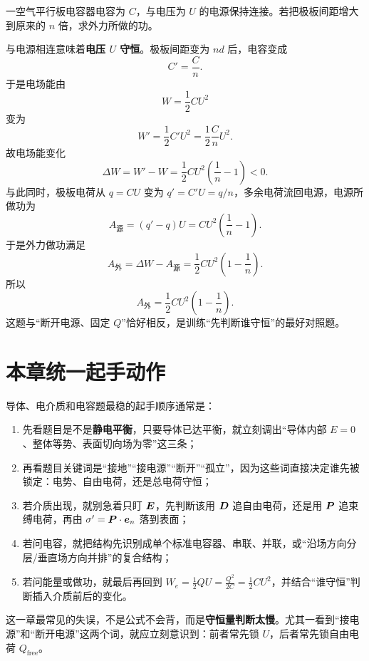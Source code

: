 \documentclass[lang=cn,11pt]{elegantbook}
\begin{document}
\begin{example}[电容器接着电源时拉大板距的外力做功]
一空气平行板电容器电容为 \(C\)，与电压为 \(U\) 的电源保持连接。若把极板间距增大到原来的 \(n\) 倍，求外力所做的功。
\end{example}

\begin{solution}
与电源相连意味着\textbf{电压 \(U\) 守恒}。极板间距变为 \(nd\) 后，电容变成
\[
C'=\frac{C}{n}.
\]
于是电场能由
\[
W=\frac12 CU^2
\]
变为
\[
W'=\frac12 C'U^2=\frac12\frac{C}{n}U^2.
\]
故电场能变化
\[
\Delta W=W'-W=\frac12 CU^2\left(\frac1n-1\right)<0.
\]
与此同时，极板电荷从 \(q=CU\) 变为 \(q'=C'U=q/n\)，多余电荷流回电源，电源所做功为
\[
A_{\text{源}}=(q'-q)U
=CU^2\left(\frac1n-1\right).
\]
于是外力做功满足
\[
A_{\text{外}}=\Delta W-A_{\text{源}}
=\frac12 CU^2\left(1-\frac1n\right).
\]
所以
\[
\boxed{
A_{\text{外}}=\frac12 CU^2\left(1-\frac1n\right).
}
\]
这题与“断开电源、固定 \(Q\)”恰好相反，是训练“先判断谁守恒”的最好对照题。
\end{solution}

\section{本章统一起手动作}

导体、电介质和电容题最稳的起手顺序通常是：
\begin{enumerate}
  \item 先看题目是不是\textbf{静电平衡}，只要导体已达平衡，就立刻调出“导体内部 \(E=0\)、整体等势、表面切向场为零”这三条；
  \item 再看题目关键词是“接地”“接电源”“断开”“孤立”，因为这些词直接决定谁先被锁定：电势、自由电荷，还是总电荷守恒；
  \item 若介质出现，就别急着只盯 \(\vb*{E}\)，先判断该用 \(\vb*{D}\) 追自由电荷，还是用 \(\vb*{P}\) 追束缚电荷，再由 \(\sigma'=\vb*{P}\cdot\vb*{e}_n\) 落到表面；
  \item 若问电容，就把结构先识别成单个标准电容器、串联、并联，或“沿场方向分层/垂直场方向并排”的复合结构；
  \item 若问能量或做功，就最后再回到 \(W_e=\frac12 QU=\frac{Q^2}{2C}=\frac12 CU^2\)，并结合“谁守恒”判断插入介质前后的变化。
\end{enumerate}

\begin{remark}
这一章最常见的失误，不是公式不会背，而是\textbf{守恒量判断太慢}。尤其一看到“接电源”和“断开电源”这两个词，就应立刻意识到：前者常先锁 \(U\)，后者常先锁自由电荷 \(Q_{\mathrm{free}}\)。
\end{remark}
\end{document}
